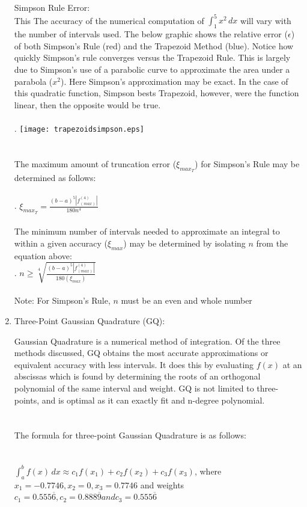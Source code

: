 \documentclass{report}
\begin{document}
\begin{enumerate}
\\
\\
\\
\\Simpson Rule Error: 
\\This
The accuracy of the numerical computation of $\displaystyle\int^5_1x^2\,dx$ will vary with the number of intervals used. The below graphic shows the relative error ($\epsilon$) of both Simpson's Rule (red) and the Trapezoid Method (blue). Notice how quickly Simpson's rule converges versus the Trapezoid Rule. This is largely due to Simpson's use of a parabolic curve to approximate the area under a parabola ($x^2$). Here Simpson's approximation may be exact. In the case of this quadratic function, Simpson bests Trapezoid, however, were the function linear, then the opposite would be true.
\\
\\.\hspace{10 mm} \texttt{[image: trapezoidsimpson.eps]}
\\
\\
\\The maximum amount of truncation error ($\xi_{max_{T}}$) for Simpson's Rule may be determined as follows:
\\
\\
. \hspace{20 mm} $\displaystyle \xi_{max_{T}} = \frac{(b-a)^{5}\left|f^{(4)}_{(max)}\right|}{180n^4}$ 
\\
\\The minimum number of intervals needed to approximate an integral to within a given accuracy ($\xi_{max}$) may be determined by isolating $\displaystyle n$ from the equation above: 
\\
. \hspace{25 mm} $\displaystyle n \geq \sqrt[4]{\frac{(b-a)^{5}\left|f^{(4)}_{(max)}\right|}{180(\xi_{max})}} $
\\
\\Note: For Simpson's Rule, $\displaystyle n$ must be an even and whole number
\\
\item Three-Point Gaussian Quadrature (GQ):

Gaussian Quadrature is a numerical method of integration. Of the three methods discussed, GQ obtains the most accurate approximations or equivalent accuracy with less intervals. It does this by evaluating $f(x)$ at an abscissas which is found by determining the roots of an orthogonal polynomial of the same interval and weight. GQ is not limited to three-points, and is optimal as it can exactly fit and n-degree polynomial.
\\
\\
\\The formula for three-point Gaussian Quadrature is as follows:
\\
\\
\\$\displaystyle \int^b_a f(x)\,dx  \approx c_1f(x_1)+c_2f(x_2)+c_3f(x_3)$, where 
\\$x_1=-0.7746, x_2=0, x_3=0.7746$ and weights $c_1=0.555\overline{6}, c_2=0.888\overline{9} and c_3=0.555\overline{6}$



\end{enumerate}
\end{document}
